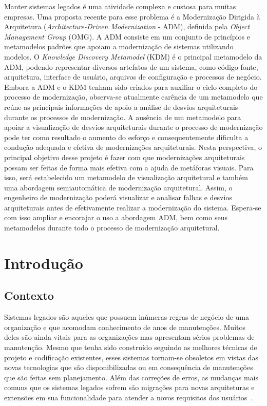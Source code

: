 \documentclass[12pt]{article}
\begin{document}
 

\setlength{\voffset}{0cm}
\setlength{\hoffset}{0cm}



\begin{resumo}
Manter sistemas legados é uma atividade complexa e custosa para muitas empresas. Uma proposta recente para esse problema é a Modernização Dirigida à Arquitetura (\textit{Architecture-Driven Modernization} - ADM), definida pela \textit{Object Management Group} (OMG). A ADM consiste em um conjunto de princípios e metamodelos padrões que apoiam a modernização de sistemas utilizando modelos. O \textit{Knowledge Discovery Metamodel} (KDM) é o principal metamodelo da ADM, podendo representar diversos artefatos de um sistema, como código-fonte, arquitetura, interface de usuário, arquivos de configuração e processos de negócio. Embora a ADM e o KDM tenham sido criados para auxiliar o ciclo completo do processo de modernização, observa-se atualmente carência de um metamodelo que reúne as principais informações de apoio a análise de desvios arquiteturais durante os processos de modernização. A ausência de um metamodelo para apoiar a visualização de desvios arquiteturais durante o processo de modernização pode ter como resultado o aumento do esforço e consequentemente dificulta a condução adequada e efetiva de modernizações arquiteturais. Nesta perspectiva, o principal objetivo desse projeto é fazer com que modernizações arquiteturais possam ser feitas de forma mais efetiva com a ajuda de metáforas visuais. Para isso, será estabelecido um metamodelo de visualização arquitetural e também uma abordagem semiautomática  de modernização arquitetural. Assim, o engenheiro de modernização poderá visualizar e analisar falhas e desvios arquiteturais antes de efetivamente realizar a modernização do sistema. Espera-se com isso ampliar e encorajar o uso a abordagem ADM, bem como seus metamodelos durante todo o processo de modernização arquitetural.
\end{resumo}
\section{Introdução}

\subsection{Contexto}

Sistemas legados são aqueles que possuem inúmeras regras de negócio de uma organização e que acomodam conhecimento de anos de manutenções. Muitos deles são ainda vitais para as organizações mas apresentam sérios problemas de manutenção. Mesmo que tenha sido construído seguindo as melhores técnicas de projeto e codificação existentes, esses sistemas tornam-se obsoletos em vistas das novas tecnologias que são disponibilizadas ou em consequência de manutenções que são feitas sem planejamento. Além das correções de erros, as mudanças mais comuns que os sistemas legados sofrem são migrações para novas arquiteturas e extensões em sua funcionalidade para atender a novos requisitos dos usuários~\cite{SoftwareReuse}.
\end{document}
